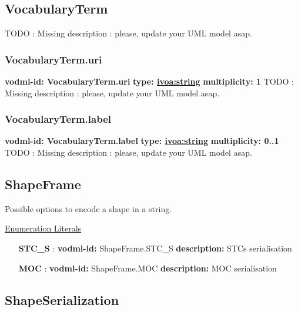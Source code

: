   \subsection{VocabularyTerm}
  \label{sect:VocabularyTerm}
    TODO : Missing description : please, update your UML model asap.

    \subsubsection{VocabularyTerm.uri}
      \textbf{vodml-id: VocabularyTerm.uri} \newline
      \textbf{type: \hyperref[sect:ivoa]{ivoa:string}} \newline
      \textbf{multiplicity: 1} \newline
      TODO : Missing description : please, update your UML model asap.

    \subsubsection{VocabularyTerm.label}
      \textbf{vodml-id: VocabularyTerm.label} \newline
      \textbf{type: \hyperref[sect:ivoa]{ivoa:string}} \newline
      \textbf{multiplicity: 0..1} \newline
      TODO : Missing description : please, update your UML model asap.

  \subsection{ShapeFrame}
  \label{sect:ShapeFrame}

  Possible options to encode a shape in a string.

  \noindent \underline{Enumeration Literals}
  \vspace{-\parsep}
  \small
  \begin{itemize}
  
    \item[\textbf{STC\_S}]: \textbf{vodml-id:} ShapeFrame.STC\_S \newline
          \textbf{description:} STCs serialisation
    \item[\textbf{MOC}]: \textbf{vodml-id:} ShapeFrame.MOC \newline
          \textbf{description:} MOC serialisation
  \end{itemize}
  \normalsize


  \subsection{ShapeSerialization}
  \label{sect:ShapeSerialization}

